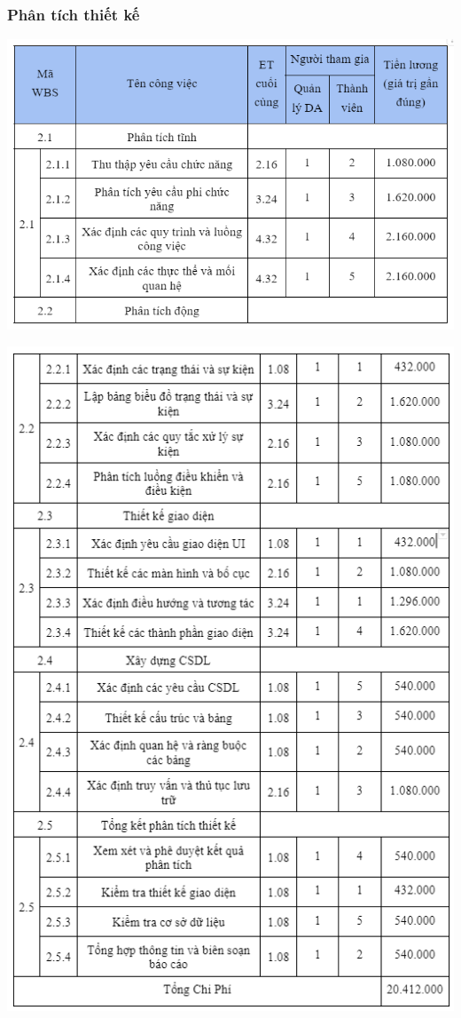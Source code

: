 \documentclass[12pt]{article}
\begin{document}
\subsubsection{Phân tích thiết kế}
\includegraphics[width=15cm]{ChiPhi3.png}
\par
\hspace{-0.5cm}\includegraphics[width=14.5cm]{ChiPhi4.png}
\vspace{0.5cm}
\end{document}
